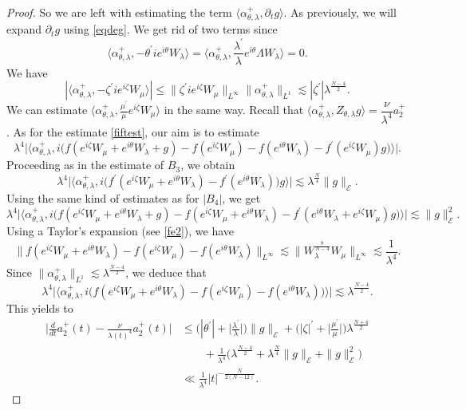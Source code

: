 \documentclass[a4paper,two-side,10pt]{amsart}
\numberwithin{equation}{section}
\begin{document}
\begin{proof}
So we are left with estimating the term $ \langle \alpha_{\theta ,\lambda}^+ , \partial_t g \rangle $. As previously, we will expand $\partial_t g$ using \eqref{eqdeg}. We get rid of two terms since
$$\langle \alpha^+_{\theta , \lambda} , - \theta^\prime i e^{i\theta}W_\lambda \rangle= \Big\langle \alpha_{\theta ,\lambda}^+ , \frac{\lambda^\prime}{\lambda} e^{i\theta} \Lambda W_\lambda \Big\rangle=0 .$$
We have
$$|\langle \alpha^+_{\theta ,\lambda} , - \zeta^\prime i e^{i\zeta} W_\mu \rangle |\leq \| \zeta^\prime i e^{i\zeta} W_\mu  \|_{L^\infty} \|\alpha_{\theta , \lambda}^+\|_{L^1}\lesssim |\zeta^\prime| \lambda^{\frac{N-4}{2}}. $$
We can estimate $\langle \alpha^+_{\theta ,\lambda} , \frac{\mu^\prime}{\mu}  e^{i\zeta} W_\mu \rangle $ in the same way.
Recall that $\langle \alpha_{\theta ,\lambda}^+ , Z_{\theta ,\lambda}g\rangle = \dfrac{\nu}{\lambda^4} a_2^+$. As for the estimate \eqref{fiftest}, our aim is to estimate
$$\lambda^4\big| \big\langle \alpha^+_{\theta ,\lambda} , i\big(f(e^{i\zeta} W_\mu +e^{i\theta} W_\lambda +g) - f(e^{i\zeta} W_\mu ) - f(e^{i\theta }W_\lambda) - f^\prime (e^{i\zeta} W_\mu) g\big) \big\rangle\big| .$$
Proceeding as in the estimate of $B_{3}$, we obtain
$$\lambda^4 \big|\big\langle \alpha_{\theta ,\lambda}^+ , i \big(f^\prime (e^{i\zeta} W_\mu +e^{i\theta} W_\lambda )- f^\prime (e^{i\theta } W_\lambda)\big)g\big\rangle\big|\lesssim \lambda^{\frac{N}{4}} \|g\|_{\mathcal{E}}.$$
Using the same kind of estimates as for $|B_{4}|$, we get
$$\lambda^4 \big|\big\langle \alpha_{\theta ,\lambda}^+ , i \big(f(e^{i\zeta} W_\mu +e^{i\theta} W_\lambda +g )-f(e^{i\zeta }W_\mu +e^{i\theta} W_\lambda)- f^\prime (e^{i\theta } W_\lambda +e^{i\zeta}W_\mu)g \big)\big\rangle\big|\lesssim \|g\|^2_{\mathcal{E}}.$$
Using a Taylor's expansion (see \eqref{fe2}), we have
$$\|f(e^{i\zeta} W_\mu +e^{i\theta} W_\lambda  )-f (e^{i\zeta} W_\mu) - f (e^{i\theta} W_\lambda )\|_{L^\infty} \lesssim \|W_\lambda^{\frac{8}{N-4}} W_\mu\|_{L^\infty}\lesssim \dfrac{1}{\lambda^4}. $$
Since $\| \alpha_{\theta ,\lambda}^+\|_{L^1} \lesssim \lambda^{\frac{N-4}{2}}$, we deduce that
$$\lambda^4  \big|\big\langle \alpha_{\theta ,\lambda}^+ , i \big(f (e^{i\zeta} W_\mu +e^{i\theta} W_\lambda  )-f (e^{i\zeta} W_\mu) - f (e^{i\theta} W_\lambda ) \big) \big\rangle \big| \lesssim  \lambda^{\frac{N-4}{2}}.$$
This yields to
\begin{align*}
\Big|\frac{d}{dt}a_2^+ (t) - \frac{\nu}{\lambda (t)^4} a_2^+ (t)\Big|& \leq \big(|\theta^\prime|+\big|\tfrac{\lambda^\prime}{\lambda}\big| \big) \|g\|_{\mathcal{E}}+ \big(|\zeta|^\prime +\big|\tfrac{\mu^\prime}{\mu}\big|\big) \lambda^{\frac{N+4}{2}} \\
&\qquad
+\frac{1}{\lambda^4}\Big(\lambda^{\frac{N-4}{2}}+ \lambda^{\frac{N}{4}} \|g\|_{\mathcal{E}}+
\|g\|_{\mathcal{E}}^2 \Big)\\
&\ll  \frac{1}{\lambda^4} |t|^{-\frac{N}{2(N-12)}}.
\end{align*}
\end{proof}
\end{document}
